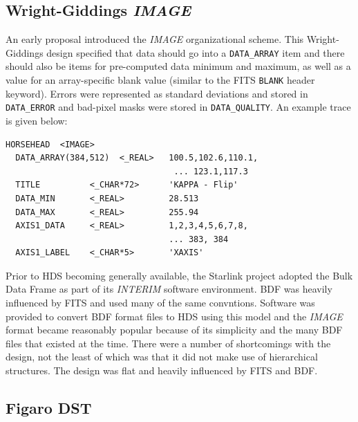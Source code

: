 \documentclass[final,authoryear,5p,times,twocolumn]{elsarticle}
\begin{document}
\subsection{Wright-Giddings \emph{IMAGE}}

An early proposal \citep[][but see also \citet{SGP38}]{WrightGiddings1983} introduced the
\emph{IMAGE} organizational scheme. This Wright-Giddings design specified that
data should go into a \texttt{DATA\_ARRAY} item and there should also be
items for pre-computed data minimum and maximum, as well as a value for
an array-specific blank value (similar to the FITS \texttt{BLANK}
header keyword). Errors were represented as standard
deviations and stored in \texttt{DATA\_ERROR} and bad-pixel masks were
stored in \texttt{DATA\_QUALITY}. An example trace is given below:

{
\small
\begin{verbatim}
HORSEHEAD  <IMAGE>
  DATA_ARRAY(384,512)  <_REAL>   100.5,102.6,110.1,
                                  ... 123.1,117.3
  TITLE          <_CHAR*72>      'KAPPA - Flip'
  DATA_MIN       <_REAL>         28.513
  DATA_MAX       <_REAL>         255.94
  AXIS1_DATA     <_REAL>         1,2,3,4,5,6,7,8,
                                 ... 383, 384
  AXIS1_LABEL    <_CHAR*5>       'XAXIS'
\end{verbatim}
}

Prior to HDS becoming generally available, the Starlink project adopted
the Bulk Data Frame \citep[BDF;][]{1980SPIE..264...70P,SUN4} as part
of its \emph{INTERIM} software environment. BDF was heavily influenced
by FITS and used many of the same convntions.  Software was provided
to convert BDF format files to HDS using this model \citep{SUN96} and
the \emph{IMAGE} format became reasonably popular because of its
simplicity and the many BDF files that existed at the time. There were
a number of shortcomings with the design, not the least of which was
that it did not make use of hierarchical structures. The design was
flat and heavily influenced by FITS and BDF.

\subsection{Figaro DST}
\end{document}
